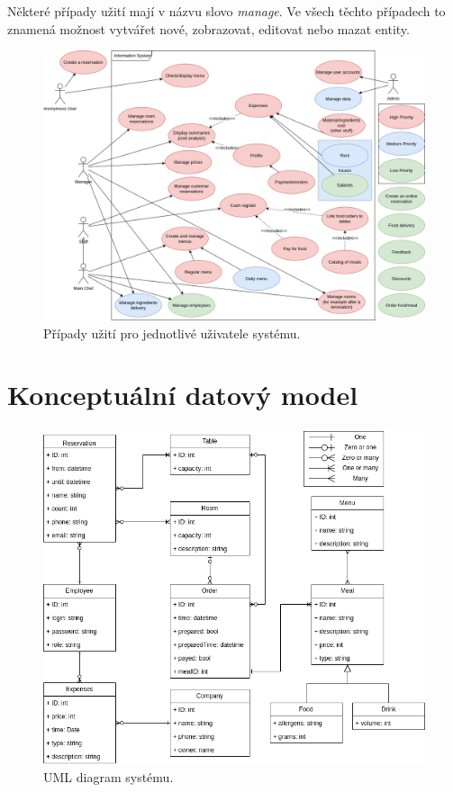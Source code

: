 \documentclass[a4paper]{article}
\begin{document}
Některé případy užití mají v názvu slovo \emph{manage}. Ve všech těchto případech to
znamená možnost vytvářet nové, zobrazovat, editovat nebo mazat entity.

\begin{figure}[ht]
    \centering
    \includegraphics[width=\textwidth]{use_case.png}
    \caption{Případy užití pro jednotlivé uživatele systému.}
\end{figure}

\newpage
\section{Konceptuální datový model}
\begin{figure}[ht]
    \centering
    \includegraphics[width=\textwidth]{uml.png}
    \caption{UML diagram systému.}
\end{figure}
\end{document}
